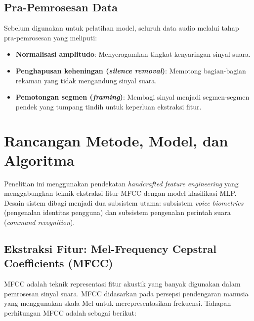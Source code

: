 \subsection*{Pra-Pemrosesan Data}

Sebelum digunakan untuk pelatihan model, seluruh data audio melalui tahap pra-pemrosesan yang meliputi:
\begin{itemize}
    \item \textbf{Normalisasi amplitudo}: Menyeragamkan tingkat kenyaringan sinyal suara.
    \item \textbf{Penghapusan keheningan (\textit{silence removal})}: Memotong bagian-bagian rekaman yang tidak mengandung sinyal suara.
    \item \textbf{Pemotongan segmen (\textit{framing})}: Membagi sinyal menjadi segmen-segmen pendek yang tumpang tindih untuk keperluan ekstraksi fitur.
\end{itemize}

\section{Rancangan Metode, Model, dan Algoritma}

Penelitian ini menggunakan pendekatan \textit{handcrafted feature engineering} yang menggabungkan teknik ekstraksi fitur MFCC dengan model klasifikasi MLP. Desain sistem dibagi menjadi dua subsistem utama: subsistem \textit{voice biometrics} (pengenalan identitas pengguna) dan subsistem pengenalan perintah suara (\textit{command recognition}).

\subsection*{Ekstraksi Fitur: Mel-Frequency Cepstral Coefficients (MFCC)}

MFCC adalah teknik representasi fitur akustik yang banyak digunakan dalam pemrosesan sinyal suara. MFCC didasarkan pada persepsi pendengaran manusia yang menggunakan skala Mel untuk merepresentasikan frekuensi. Tahapan perhitungan MFCC adalah sebagai berikut:


